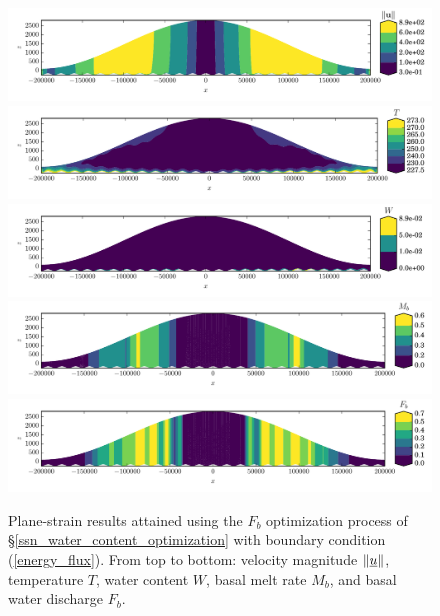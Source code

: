 \begin{figure}
  \centering

    \includegraphics[width=\linewidth]{images/tmc/plane_strain/Fb/U_mag.pdf}
    \includegraphics[width=\linewidth]{images/tmc/plane_strain/Fb/T.pdf}
    \includegraphics[width=\linewidth]{images/tmc/plane_strain/Fb/W.pdf}
    \includegraphics[width=\linewidth]{images/tmc/plane_strain/Fb/Mb.pdf}
    \includegraphics[width=\linewidth]{images/tmc/plane_strain/Fb/Fb.pdf}

  \caption[Plane-strain water-optimization solution]{Plane-strain results attained using the $F_b$ optimization process of \S \ref{ssn_water_content_optimization} with boundary condition (\ref{energy_flux}).  From top to bottom: velocity magnitude $\Vert \underline{u} \Vert$, temperature $T$, water content $W$, basal melt rate $M_b$, and basal water discharge $F_b$.}
  \label{tmc_Fb_image}
\end{figure}
